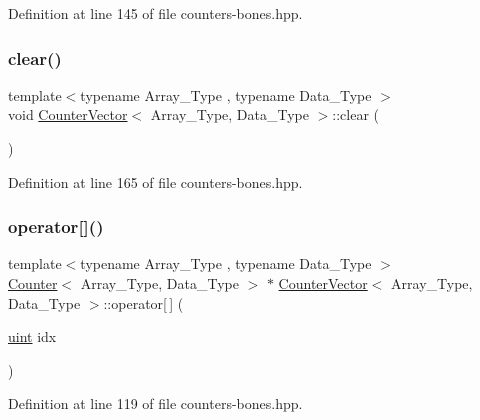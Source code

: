 Definition at line 145 of file counters-\/bones.\+hpp.

\mbox{\label{class_counter_vector_acce75748f917e3a7898d49a23df996e7}} 
\subsubsection{\texorpdfstring{clear()}{clear()}}
{\footnotesize\ttfamily template$<$typename Array\+\_\+\+Type , typename Data\+\_\+\+Type $>$ \\
void \hyperlink{class_counter_vector}{Counter\+Vector}$<$ Array\+\_\+\+Type, Data\+\_\+\+Type $>$\+::clear (\begin{DoxyParamCaption}{ }\end{DoxyParamCaption})\hspace{0.3cm}{\ttfamily [inline]}}



Definition at line 165 of file counters-\/bones.\+hpp.

\mbox{\label{class_counter_vector_a6eac3e73298e1e6d424b92f324ffe9a8}} 
\subsubsection{\texorpdfstring{operator[]()}{operator[]()}}
{\footnotesize\ttfamily template$<$typename Array\+\_\+\+Type , typename Data\+\_\+\+Type $>$ \\
\hyperlink{class_counter}{Counter}$<$ Array\+\_\+\+Type, Data\+\_\+\+Type $>$ $\ast$ \hyperlink{class_counter_vector}{Counter\+Vector}$<$ Array\+\_\+\+Type, Data\+\_\+\+Type $>$\+::operator\mbox{[}$\,$\mbox{]} (\begin{DoxyParamCaption}\item[{\hyperlink{typedefs_8hpp_a91ad9478d81a7aaf2593e8d9c3d06a14}{uint}}]{idx }\end{DoxyParamCaption})\hspace{0.3cm}{\ttfamily [inline]}}



Definition at line 119 of file counters-\/bones.\+hpp.

\mbox{\label{class_counter_vector_affee3825ee1b1ce01b926f443c67f585}} 
